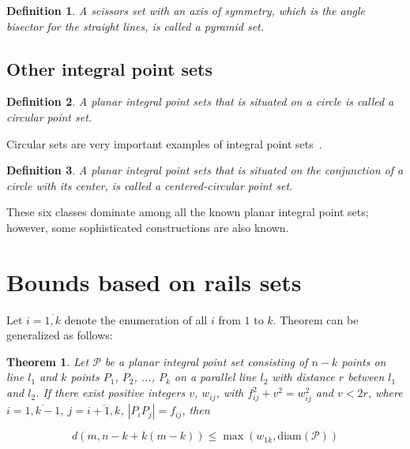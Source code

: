 \documentclass[12pt]{article}
\theoremstyle{theorem}
\newtheorem{theorem}{Theorem}
\theoremstyle{dfn}
\newtheorem{dfn}{Definition}
\theoremstyle{remark}
\begin{document}
\begin{dfn}
	A scissors set with an axis of symmetry,
	which is the angle bisector for the straight lines,
	is called a \textit{pyramid} set.
\end{dfn}



\subsection{Other integral point sets}

\begin{dfn}
	A planar integral point sets that is situated on a circle is called a \textit{circular}
	point set.
\end{dfn}

Circular sets are very important examples
of integral point sets~\cite{harborth1993upper,piepmeyer1996maximum,bat2018number}.


\begin{dfn}
	A planar integral point sets that is situated on the conjunction of a circle with its center,
	is called a \textit{centered-circular} point set.
\end{dfn}

These six classes dominate among all the known planar integral point sets;
however, some sophisticated constructions are also known.


\section{Bounds based on rails sets}

Let $i = \overline{1, k}$ denote the enumeration of all $i$
from $1$ to $k$.
Theorem \cite[Theorem 2.1]{kurz2008bounds} can be generalized as follows:

\begin{theorem}
	Let $\mathcal{P}$ be a planar integral point set consisting of
	$n - k$ points on line $l_1$ and $k$ points $P_1$, $P_2$, ..., $P_k$ on a
	parallel line $l_2$ with distance $r$ between $l_1$ and $l_2$. If there
	exist positive integers $v$, $w_{ij}$, with $f_{ij}^{2} + v^{2}
	= w_{ij}^{2}$ and $v < 2r$, where $i = \overline{1, k - 1}$, $j =
	\overline{i + 1, k}$, $|P_{i}P_{j}| = f_{ij}$,
	then

	\begin{equation}
		d(m, n - k + k(m - k)) \leq \max(w_{1k}, \operatorname{diam(\mathcal{P})})
	\end{equation}

\end{theorem}
\end{document}
